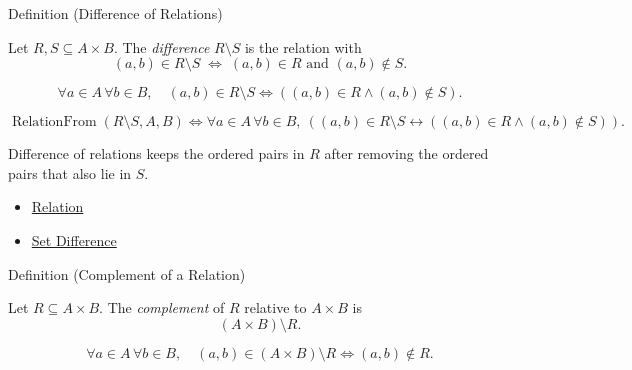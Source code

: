 \begin{definitionbox}{Definition (Difference of Relations)}
\begin{definition}\label{def:relation-difference}
Let $R,S\subseteq A\times B$. The \emph{difference} $R\setminus S$ is the
relation with
\[
(a,b)\in R\setminus S
\;\Longleftrightarrow\;
(a,b)\in R \text{ and } (a,b)\notin S.
\]
\end{definition}
\end{definitionbox}

\begin{remark*}
\[
  \forall a\in A\,\forall b\in B,\quad
  (a,b)\in R\setminus S
  \iff
  ((a,b)\in R\wedge(a,b)\notin S).
\]
\end{remark*}

\begin{remark*}
\[
  \operatorname{RelationFrom}(R\setminus S,A,B)
  \iff
  \forall a\in A\,\forall b\in B,\ ((a,b)\in R\setminus S \leftrightarrow ((a,b)\in R\wedge(a,b)\notin S)).
\]
\end{remark*}

\begin{remark*}[Interpretation]
Difference of relations keeps the ordered pairs in $R$ after removing the
ordered pairs that also lie in $S$.
\end{remark*}

\begin{dependencies}
\begin{itemize}
  \item \hyperref[def:relation]{Relation}
  \item \hyperref[def:set-difference]{Set Difference}
\end{itemize}
\end{dependencies}

\begin{definitionbox}{Definition (Complement of a Relation)}
\begin{definition}\label{def:relation-complement}
Let $R\subseteq A\times B$. The \emph{complement} of $R$ relative to
$A\times B$ is
\[
(A\times B)\setminus R.
\]
\end{definition}
\end{definitionbox}

\begin{remark*}
\[
  \forall a\in A\,\forall b\in B,\quad
  (a,b)\in (A\times B)\setminus R
  \iff
  (a,b)\notin R.
\]
\end{remark*}

